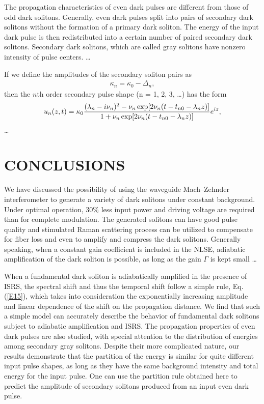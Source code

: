 The propagation characteristics of even dark pulses are different from
those of odd dark solitons. Generally, even dark pulses  split into pairs
of secondary dark solitons without the formation of a primary dark soliton.
The energy of the input dark pulse is then redistributed into a certain
number of paired secondary dark solitons.  Secondary dark solitons, which
are called gray solitons\cite{TB} have nonzero intensity of pulse
centers.
\ldots


If we define the amplitudes of the secondary soliton pairs as
\begin{eqnarray}
\kappa_n  =  \kappa_0 - \Delta_{n} ,  \label{E16}
\end{eqnarray}
then the $n$th order secondary pulse shape (n = 1, 2, 3, \ldots )
has the form
\begin{eqnarray}
u_n (z,t)  =  \kappa_{0}{(\lambda_n - i \nu_n )^2 - \nu_n
\,{\rm exp} [ 2 \nu_n (t-t_{n0} - \lambda_{n} z)] \over  1 +
\nu_n\, {\rm exp} [ 2 \nu_n (t-t_{n0} - \lambda_n z)]} e^{iz},
\label{E17}
\end{eqnarray}
\ldots


\section{CONCLUSIONS}
We have discussed the possibility of using the waveguide Mach--Zehnder
interferometer to generate a variety of dark solitons under constant
background.  Under optimal operation,  30\% less input power and driving
voltage are required than for complete modulation.  The generated solitons
can have good pulse quality and stimulated Raman scattering process can be
utilized to compensate for fiber loss and even to amplify and compress the
dark solitons.  Generally speaking, when a constant gain coefficient is
included in the NLSE, adiabatic amplification of the dark soliton is
possible, as long as the gain $\Gamma $ is kept small
\ldots

When a fundamental dark soliton is adiabatically amplified in the presence
of ISRS, the spectral shift and thus the temporal shift follow a simple
rule, Eq. (\ref{E15}), which takes into consideration the exponentially
increasing amplitude and linear dependence of the shift on the propagation
distance.  We find that such a simple model can accurately describe the
behavior of fundamental dark solitons subject to adiabatic amplification
and ISRS.  The propagation properties of even dark pulses are also studied,
with special attention to the distribution of energies among secondary gray
solitons.  Despite their more complicated nature, our results demonstrate
that the partition of the energy is similar for quite different input pulse
shapes, as long as they have the same background intensity and total energy
for the input pulse.  One can use the partition rule obtained here to
predict the amplitude of secondary solitons produced from an input even
dark pulse.



